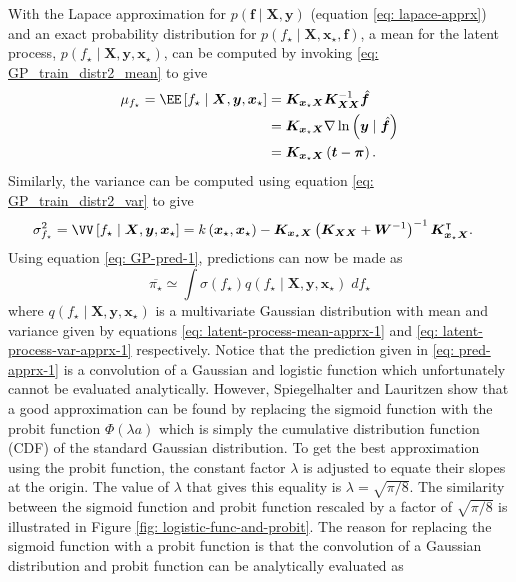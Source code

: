 With the Lapace approximation for $p \left( \bm{f} \mid \bm{X} , \bm{y} \right)$ (equation \ref{eq: lapace-apprx}) and an exact probability distribution for $p \left( f_{\star} \mid \bm{X} , \bm{x}_{\star}, \bm{f} \right)$, a mean for the latent process, $p \left( f_{\star} \mid \bm{X} , \bm{y} , \bm{x}_{\star} \right)$, can be computed by invoking \ref{eq: GP_train_distr2_mean} to give
\begin{align}
    \mu_{f_{\star}} = \EE \left[ f_{\star} \mid \bm{X} , \bm{y} , \bm{x}_{\star} \right]
     & = \bm{K}_{\bm{x}_{\star} \bm{X}} \bm{K}_{\bm{X} \bm{X}}^{-1} \hat{\bm{f}}           \nonumber               \\
     & = \bm{K}_{\bm{x}_{\star} \bm{X}} \nabla \ln \left( \bm{y} \mid \hat{\bm{f}} \right) \nonumber               \\
     & = \bm{K}_{\bm{x}_{\star} \bm{X}} \left( \bm{t} - \bm{\pi} \right) \label{eq: latent-process-mean-apprx-1} .
\end{align}
Similarly, the variance can be computed using equation \ref{eq: GP_train_distr2_var} to give
\begin{align} \label{eq: latent-process-var-apprx-1}
    \sigma_{f_{\star}}^2 = \VV \left[ f_{\star} \mid \bm{X} , \bm{y} , \bm{x}_{\star} \right]
     & = k \left( \bm{x}_{\star} , \bm{x}_{\star} \right) - \bm{K}_{\bm{x}_{\star} \bm{X}} \left( \bm{K}_{\bm{X} \bm{X}} + \bm{W}^{-1} \right)^{-1} \bm{K}_{\bm{x}_{\star} \bm{X}}^{\intercal}.
\end{align}
Using equation \ref{eq: GP-pred-1}, predictions can now be made as
\begin{equation} \label{eq: pred-apprx-1}
    \overline{\pi_{\star}} \simeq \int \sigma \left( f_{\star} \right) q \left( f_{\star} \mid \bm{X} , \bm{y} , \bm{x}_{\star} \right) \; d f_{\star}
\end{equation}
where $q \left( f_{\star} \mid \bm{X} , \bm{y} , \bm{x}_{\star} \right)$ is a multivariate Gaussian distribution with mean and variance given by equations \ref{eq: latent-process-mean-apprx-1} and \ref{eq: latent-process-var-apprx-1} respectively. Notice that the prediction given in \ref{eq: pred-apprx-1} is a convolution of a Gaussian and logistic function which unfortunately cannot be evaluated analytically. However, Spiegelhalter and Lauritzen \cite{spiegelhalter1990sequential} show that a good approximation can be found by replacing the sigmoid function with the probit function $\Phi \left( \lambda a \right)$ which is simply the cumulative distribution function (CDF) of the standard Gaussian distribution. To get the best approximation using the probit function, the constant factor $\lambda$ is adjusted to equate their slopes at the origin. The value of $\lambda$ that gives this equality is $\lambda = \sqrt{\pi / 8}$. The similarity between the sigmoid function and probit function rescaled by a factor of $\sqrt{\pi / 8}$ is illustrated in Figure \ref{fig: logistic-func-and-probit}. The reason for replacing the sigmoid function with a probit function is that the convolution of a Gaussian distribution and probit function can be analytically evaluated as
